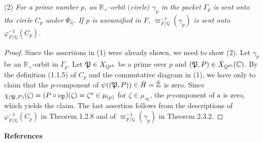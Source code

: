 \documentclass[12pt, leqno]{article}
\begin{document}
(2) {\it For a prime number $p$, an $\mathbb{R}_+$-orbit $($circle$)$ $\gamma_p$ in the packet $\Gamma_p$ is sent onto the circle $C_p$ under $\Psi_{\mathbb{Q}}$. 
If $p$ is unramified in $F$, $\varpi_{F/\mathbb{Q}}^{-1}(\gamma_p)$ is sent onto $\varphi_{F/\mathbb{Q}}^{-1}(C_p)$.}
\begin{proof} Since the assertions in (1) were already shown, we need to show (2). Let $\gamma_p$ be an $\mathbb{R}_+$-orbit in $\Gamma_p$. Let $\frak{P} \in X_{\mathbb{Q}^{\rm ab}}$ be a prime over $p$ and $(\frak{P}, P) \in \dot{X}_{\mathbb{Q}^{\rm ab}}(\mathbb{C})$. By the definition (1.1.5) of $C_p$ and the commutative diagram in (1), we have only to claim that the $p$-component of $\psi((\frak{P},P)) \in \dot{H} = \hat{\mathbb{Z}}$ is  zero.  Since $\chi_{(\frak{P},P)}(\zeta) = (P\circ \iota_{\frak{P}})(\zeta) = \zeta^a  \in \mu_{(p)}$ for $\zeta \in \mu_{\infty}$, the $p$-component of $a$ is zero, which yields the claim. The last assertion follows from the descriptions of  $\varphi_{F/\mathbb{Q}}^{-1}(C_p)$ in Theorem 1.2.8 and of $\varpi_{F/\mathbb{Q}}^{-1}(\gamma_p)$ in Theorem 2.3.2. \end{proof} 
\par\medskip
\par\noindent
{\bf References}	
\end{document}
